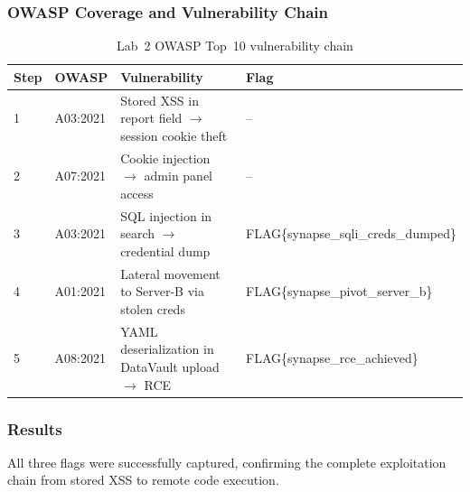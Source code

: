 \subsubsection*{OWASP Coverage and Vulnerability Chain}

\begin{table}[H]
\centering
\small
\begin{tabularx}{\textwidth}{llXl}
\toprule
\textbf{Step} & \textbf{OWASP} & \textbf{Vulnerability} & \textbf{Flag} \\
\midrule
1 & A03:2021 & Stored XSS in report field $\rightarrow$ session cookie theft & -- \\
2 & A07:2021 & Cookie injection $\rightarrow$ admin panel access & -- \\
3 & A03:2021 & SQL injection in search $\rightarrow$ credential dump & FLAG\{synapse\_sqli\_creds\_dumped\} \\
4 & A01:2021 & Lateral movement to Server-B via stolen creds & FLAG\{synapse\_pivot\_server\_b\} \\
5 & A08:2021 & YAML deserialization in DataVault upload $\rightarrow$ RCE & FLAG\{synapse\_rce\_achieved\} \\
\bottomrule
\end{tabularx}
\caption{Lab~2 OWASP Top~10 vulnerability chain}
\label{tab:lab2-vulns}
\end{table}

\subsubsection*{Results}

All three flags were successfully captured, confirming the complete exploitation
chain from stored XSS to remote code execution.

\begin{table}[H]
\centering
{}
\caption{Lab~2 flags and acquisition techniques}
\label{tab:lab2-flags}
\end{table}

